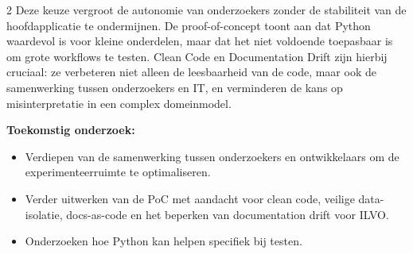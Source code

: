 \documentclass[a0,portrait]{hogent-poster}
\begin{document}
\begin{multicols}{2}
Deze keuze vergroot de autonomie van onderzoekers zonder de stabiliteit van de hoofdapplicatie te ondermijnen. De proof-of-concept toont aan dat Python waardevol is voor kleine onderdelen, maar dat het niet voldoende toepasbaar is om grote workflows te testen. Clean Code en Documentation Drift zijn hierbij cruciaal: ze verbeteren niet alleen de leesbaarheid van de code, maar ook de samenwerking tussen onderzoekers en IT, en verminderen de kans op misinterpretatie in een complex domeinmodel.

\textbf{Toekomstig onderzoek:}
\begin{itemize}
    \item Verdiepen van de samenwerking tussen onderzoekers en ontwikkelaars om de experimenteerruimte te optimaliseren.
    \item Verder uitwerken van de PoC met aandacht voor clean code, veilige data-isolatie, docs-as-code en het beperken van documentation drift voor ILVO.
    \item Onderzoeken hoe Python kan helpen specifiek bij testen.
\end{itemize}

\end{multicols}
\end{document}
